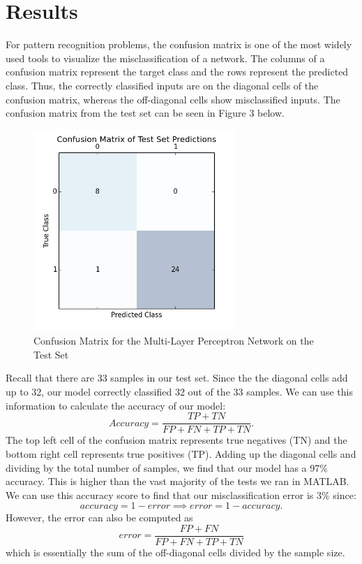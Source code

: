 \documentclass[12pt,halfline,a4paper]{ouparticle}
\begin{document}
\section{Results}
\label{sec6}

For pattern recognition problems, the confusion matrix is one of the most widely used tools to visualize the misclassification of a network. The columns of a confusion matrix represent the target class and the rows represent the predicted class. Thus, the correctly classified inputs are on the diagonal cells of the confusion matrix, whereas the off-diagonal cells show misclassified inputs. The confusion matrix from the test set can be seen in Figure 3 below. 
\begin{figure}[H]
\centering
\includegraphics[width = 3in]{figs/confmat.png}
\caption{Confusion Matrix for the Multi-Layer Perceptron Network on the Test Set}
\end{figure}  

Recall that there are 33 samples in our test set. Since the the diagonal cells add up to 32, our model correctly classified 32 out of the 33 samples. We can use this information to calculate the accuracy of our model: 
\begin{equation}
Accuracy = \frac{TP + TN}{FP + FN + TP + TN}.
\end{equation}
The top left cell of the confusion matrix represents true negatives (TN) and the bottom right cell represents true positives (TP). Adding up the diagonal cells and dividing by the total number of samples, we find that our model has a 97\% accuracy. This is higher than the vast majority of the tests we ran in MATLAB. We can use this accuracy score to find that our misclassification error is 3\% since: 
\begin{equation}
accuracy = 1 - error \implies error = 1 - accuracy. 
\end{equation}
However, the error can also be computed as
\begin{equation}
error = \frac{FP + FN}{FP + FN + TP + TN}
\end{equation}
which is essentially the sum of the off-diagonal cells divided by the sample size. 
\end{document}
